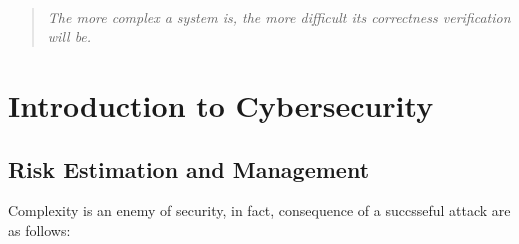 \

\vfill

\begin{center}
    \begin{quotation}
    \raggedleft
    \textit{The more complex a system is, the more \newline difficult its correctness verification will be.}
    \end{quotation}
\end{center}
\vfill

\chapter{Introduction to Cybersecurity}


\section{Risk Estimation and Management}
\cite{01_introduction}
Complexity is an enemy of security, in fact, consequence of a succsseful attack are as follows:
